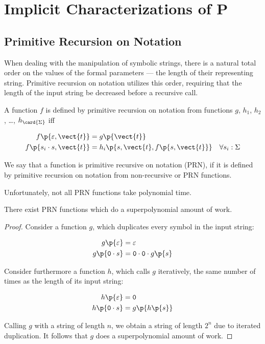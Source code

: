 
\chapter{Implicit Characterizations of P}

\section{Primitive Recursion on Notation}

When dealing with the manipulation of symbolic strings, there is a natural
total order on the values of the formal parameters --- the length of their
representing string. Primitive recursion on notation utilizes this order,
requiring that the length of the input string be decreased before a recursive
call.

\begin{definition} A function $f$ is defined by primitive recursion on notation
from functions $g$, $h_1$, $h_2$, \ldots, $h_{\card{\Sigma}}$ iff 

\begin{align}
f\p{\varepsilon, \vect{t}}  &= g\p{\vect{t}} \\
f\p{s_i \cdot s,\vect{t}} &= h_i\p{s,\vect{t},f\p{s,\vect{t}}} & \forall s_i: \Sigma
\end{align}

\end{definition}

We say that a function is primitive recursive on notation (PRN), if it is defined by
primitive recursion on notation from non-recursive or PRN functions.

Unfortunately, not all PRN functions take polynomial time.

\begin{theorem} There exist PRN functions which do a superpolynomial amount of
work.\end{theorem} 

\begin{proof}
Consider a function $g$, which duplicates every symbol in the input string:

\begin{align}
g\p{\varepsilon} &= \varepsilon \\
g\p{\mathtt{0} \cdot s} &= \mathtt{0} \cdot \mathtt{0} \cdot g\p{s}
\end{align}

Consider furthermore a function $h$, which calls $g$ iteratively, the same
number of times as the length of its input string:

\begin{align}
h\p{\varepsilon} &= \mathtt{0} \\
h\p{\mathtt{0} \cdot s} &= g\p{h\p{s}}
\end{align}

Calling $g$ with a string of length $n$, we obtain a string of length $2^n$ due
to iterated duplication. It follows that $g$ does a superpolynomial amount of
work. \end{proof}

